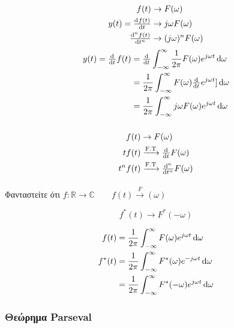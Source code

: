      \paragraph{}
     \begin{align*}
     f(t) &\to F(\omega)\\
     y(t)=\od{f(t)}{t}&\to j\omega F(\omega ) \\
     \od[n]{f(t)}{t}&\to (j\omega )^nF(\omega )
     \end{align*}
     \begin{align*}
     y(t)=\od{}{t}f(t) &= \od{}{t} \int_{-\infty}^{\infty} \frac{1}{2\pi}
     F(\omega ) e^{j\omega t}\dif \omega 
     \\ &= \frac{1}{2\pi}\int_{-\infty}^{\infty} F(\omega )\od{}{t}
     e^{j\omega t}]\dif \omega
     \\ &= \frac{1}{2\pi} \int_{-\infty}^{\infty} j\omega F(\omega )
     e^{j\omega t}\dif \omega 
     \end{align*}
     \subparagraph{}
     
     \begin{align*}
     f(t)&\to F(\omega )\\
     tf(t)&\xrightarrow{\text{F.T}}\od{}{t} F(\omega )\\
     t^nf(t)&\xrightarrow{\text{F.T}}\od[n]{}{t} F(\omega )\\
     \end{align*}
     
     \paragraph{}
     Φανταστείτε ότι \( f:\mathbb R\to\mathbb C \qquad 
     f(t) \xrightarrow F(\omega )
      \)
     
     \[
     f^*(t) \to F^*(-\omega )
     \]
     
     \begin{align*}
     f(t) &= \frac{1}{2\pi}\int_{-\infty}^{\infty} F(\omega)e^{j\omega t}\dif \omega \\
     f^*(t) &= \frac{1}{2\pi}\int_{-\infty}^{\infty} 
     F^*(\omega)e^{-j\omega t}\dif \omega \\
     &= \frac{1}{2\pi}\int_{-\infty}^{\infty}
     F^*(-\omega )e^{j\omega t}\dif \omega 
     \end{align*}
     
     \subsubsection{Θεώρημα Parseval}
     
